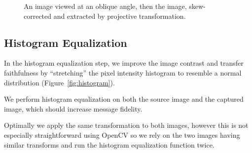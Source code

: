 \documentclass[11pt, letterpaper]{article}
\begin{document}
\begin{figure}[hbtp]
\caption{An image viewed at an oblique angle, then the image, skew-corrected and extracted by projective transformation.}
\label{fig:skew}
\end{figure}


\subsection{Histogram Equalization}
In the histogram equalization step, we improve the image contrast and transfer faithfulness by ``stretching'' the pixel intensity histogram to resemble a normal distribution (Figure~\ref{fig:histogram}).

We perform histogram equalization on both the source image and the captured image, which should increase message fidelity.

Optimally we apply the same transformation to both images, however this is not especially straightforward using OpenCV so we rely on the two images having similar transforms and run the histogram equalization function twice.
\end{document}
